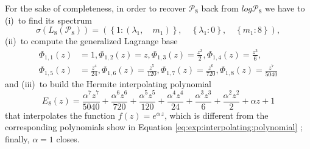 \vfill

\begin{remark}
For the sake of completeness, in order to recover $\mathcal{P}_{8}$ back from
$log{\mathcal{P}_{8}}$ we have to (i)~to find its spectrum
\begin{displaymath}
\sigma{\left ({L_{ 8 }}{\left (\mathcal{P}_{ 8 } \right )} \right )} = \left ( \left \{ 1 : \left ( \lambda_{1}, \quad m_{1}\right )\right \}, \quad \left \{ \lambda_{1} : 0\right \}, \quad \left \{ m_{1} : 8\right \}\right ),
\end{displaymath}
(ii)~to compute the generalized Lagrange base
\begin{displaymath}
\begin{split}
\Phi_{ 1, 1 }{\left (z \right )} &= 1, \Phi_{ 1, 2 }{\left (z \right )} = z, \Phi_{ 1, 3 }{\left (z \right )} = \frac{z^{2}}{2}, \Phi_{ 1, 4 }{\left (z \right )} = \frac{z^{3}}{6},\\
\Phi_{ 1, 5 }{\left (z \right )} &= \frac{z^{4}}{24}, \Phi_{ 1, 6 }{\left (z \right )} = \frac{z^{5}}{120}, \Phi_{ 1, 7 }{\left (z \right )} = \frac{z^{6}}{720}, \Phi_{ 1, 8 }{\left (z \right )} = \frac{z^{7}}{5040}
\end{split}
\end{displaymath}
and (iii)~to build the Hermite interpolating polynomial
\begin{displaymath}
{E_{ 8 }}{\left (z \right )} = \frac{\alpha^{7} z^{7}}{5040} + \frac{\alpha^{6} z^{6}}{720} + \frac{\alpha^{5} z^{5}}{120} + \frac{\alpha^{4} z^{4}}{24} + \frac{\alpha^{3} z^{3}}{6} + \frac{\alpha^{2} z^{2}}{2} + \alpha z + 1
\end{displaymath}
that interpolates the function $f(z)=e^{\alpha\,z}$, which is different from
the corresponding polynomials show in Equation
\ref{eq:exp:interpolating:polynomial} ; finally, $\alpha=1$ closes.
\end{remark}
